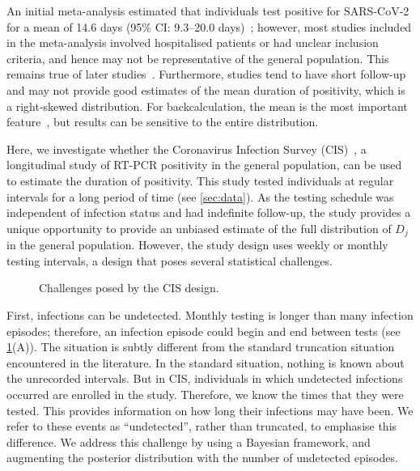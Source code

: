 \documentclass[12pt]{article}
\begin{document}
An initial meta-analysis estimated that individuals test positive for SARS-CoV-2 for a mean of 14.6 days (95\% CI: 9.3--20.0 days)~\citep{cevikShedding}; however, most studies included in the meta-analysis involved hospitalised patients or had unclear inclusion criteria, and hence may not be representative of the general population.
This remains true of later studies~\citep[e.g.]{ealesCharacterising,hellewellPCRSensitivity}.
Furthermore, studies tend to have short follow-up and may not provide good estimates of the mean duration of positivity, which is a right-skewed distribution.
For backcalculation, the mean is the most important feature~\citep{freemanPrevalence}, but results can be sensitive to the entire distribution.

Here, we investigate whether the Coronavirus Infection Survey (CIS)~\citep{CIS}, a longitudinal study of RT-PCR positivity in the general population, can be used to estimate the duration of positivity.
This study tested individuals at regular intervals for a long period of time (see \cref{sec:data}).
As the testing schedule was independent of infection status and had indefinite follow-up, the study provides a unique opportunity to provide an unbiased estimate of the full distribution of $D_j$ in the general population.
However, the study design uses weekly or monthly testing intervals, a design that poses several statistical challenges.

\begin{figure}
  \caption{%
    Challenges posed by the CIS design.
  }
  \label{fig:challenges}
\end{figure}

First, infections can be undetected.
Monthly testing is longer than many infection episodes; therefore, an infection episode could begin and end between tests (see \cref{fig:challenges}(A)).
The situation is subtly different from the standard truncation situation encountered in the literature.
In the standard situation, nothing is known about the unrecorded intervals.
But in CIS, individuals in which undetected infections occurred are enrolled in the study.
Therefore, we know the times that they were tested.
This provides information on how long their infections may have been.
We refer to these events as ``undetected'', rather than truncated, to emphasise this difference.
We address this challenge by using a Bayesian framework, and augmenting the posterior distribution with the number of undetected episodes.
\end{document}
